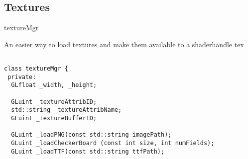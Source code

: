 \documentclass[12pt]{article}
\begin{document}
\subsection{Textures}

\begin{frame}[fragile]{textureMgr}

An easier way to load textures and make them available to a shaderhandle tex

\begin{verbatim}

class textureMgr {
 private:
  GLfloat _width, _height;

  GLuint _textureAttribID;
  std::string _textureAttribName;
  GLuint _textureBufferID;

  GLuint _loadPNG(const std::string imagePath);
  GLuint _loadCheckerBoard (const int size, int numFields);
  GLuint _loadTTF(const std::string ttfPath);
\end{verbatim}


\end{frame}
\end{document}
